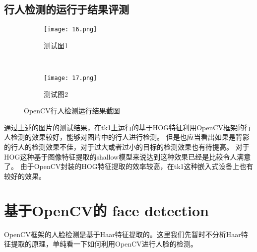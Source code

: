 \documentclass[openany]{ctexbook}
\begin{document}
\subsection{行人检测的运行于结果评测}
\begin{figure*}[h]
    \centering
        \begin{subfigure}[h!]{0.5\textwidth}
            \centering
            \texttt{[image: 16.png]}
            \caption{测试图1}
        \end{subfigure}%
        ~
        \begin{subfigure}[h!]{0.5\textwidth}
            \centering
            \texttt{[image: 17.png]}
            \caption{测试图2}
        \end{subfigure}
        \caption{OpenCV行人检测运行结果截图}
\end{figure*}
通过上述的图片的测试结果，在tk1上运行的基于HOG特征利用OpenCV框架的行人检测的效果较好，能够对图片中的行人进行检测。
但是也应当看出如果是背影的行人的检测效果不佳，对于过大或者过小的目标的检测效果也有待提高。
对于HOG这种基于图像特征提取的shallow模型来说达到这种效果已经是比较令人满意了。
由于OpenCV封装的HOG特征提取的效率较高，在tk1这种嵌入式设备上也有较好的效果。
\section{基于OpenCV的 face detection}
OpenCV框架的人脸检测是基于Haar特征提取的。这里我们先暂时不分析Haar特征提取的原理，单纯看一下如何利用OpenCV进行人脸的检测。
\end{document}
